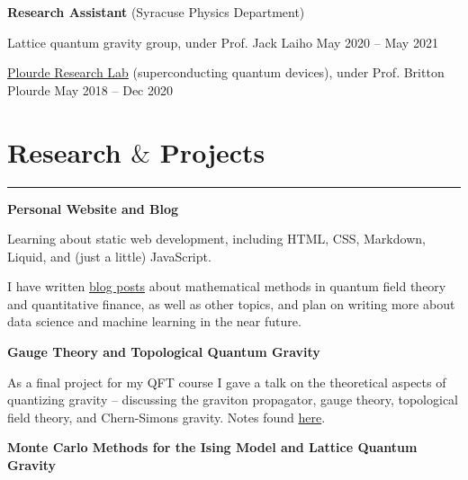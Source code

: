\documentclass{article}
\newcommand{\myline}{\rule[\baselineskip]{\linewidth}{1pt}}
\begin{document}
\vspace{2.5pt}
\large\textbf{Research Assistant} \normalsize (Syracuse Physics Department)
\normalsize

\begin{compactitem}
\item Lattice quantum gravity group, under Prof. Jack Laiho \hfill \small May 2020 -- May 2021 
\normalsize
\item \href{https://bplourde.expressions.syr.edu/}{Plourde Research Lab} (superconducting quantum devices), under Prof. Britton Plourde \hfill \small May 2018 -- Dec 2020
\end{compactitem}




\section{Research $\&$ Projects}

\myline

\large\textbf{Personal Website and Blog}
\normalsize

\begin{compactitem}
\item Learning about static web development, including HTML, CSS, Markdown, Liquid, and (just a little) JavaScript. 
\item I have written \href{https://aarontrowbridge.github.io/blog/}{blog posts} about mathematical methods in quantum field theory and quantitative finance, as well as other topics, and plan on writing more about data science and machine learning in the near future. 
\end{compactitem}



\vspace{2.5pt}
\large\textbf{Gauge Theory and Topological Quantum Gravity}
\normalsize

\begin{compactitem}
\item As a final project for my QFT course I gave a talk on the theoretical aspects of quantizing gravity -- discussing the graviton propagator, gauge theory, topological field theory, and Chern-Simons gravity. Notes found \href{https://aarontrowbridge.github.io/notes/}{here}.
\end{compactitem}


\vspace{2.5pt}
\large\textbf{Monte Carlo Methods for the Ising Model and Lattice Quantum Gravity}
\normalsize
\end{document}
